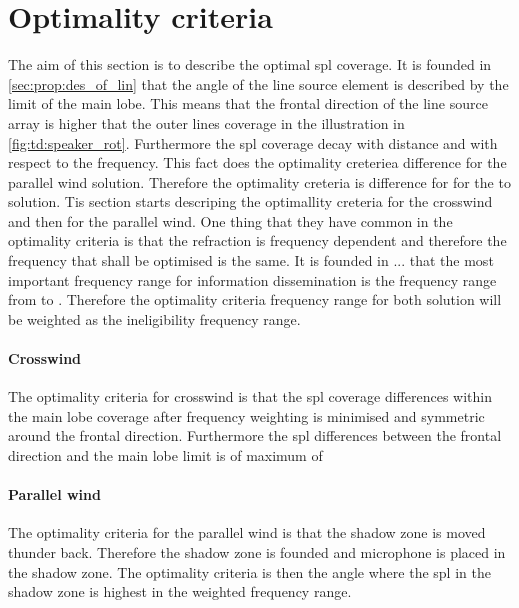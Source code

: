 \section{Optimality criteria}
The aim of this section is to describe the optimal \gls{spl} coverage. It is founded in \autoref{sec:prop:des_of_lin} that the angle of the line source element is described by the  limit of the main lobe. This means that the frontal direction of the line source array is  higher that the outer lines coverage in the illustration in \autoref{fig:td:speaker_rot}. Furthermore the \gls{spl} coverage decay with distance and with respect to the frequency. This fact does the optimality creteriea difference for the parallel wind solution. Therefore the optimality creteria is difference for for the to solution. Tis section starts descriping the optimallity creteria for the crosswind and then for the parallel wind. One thing that they have common in the optimality criteria is that the refraction is frequency dependent and therefore the frequency that shall be optimised is the same. It is founded in ... that the most important frequency range for information dissemination is the frequency range from  to . Therefore the optimality criteria frequency range for both solution will be weighted as the ineligibility frequency range. 


\paragraph{Crosswind} The optimality criteria for crosswind is that the \gls{spl} coverage differences within the main lobe coverage after frequency weighting is minimised and symmetric around the frontal direction. Furthermore the \gls{spl} differences between the frontal direction and the main lobe limit is of maximum of 

\paragraph{Parallel wind} The optimality criteria for the parallel wind is that the shadow zone is moved thunder back. Therefore the shadow zone is founded and microphone is placed in the shadow zone. The optimality criteria is then the angle where the \gls{spl} in the shadow zone is highest in the weighted frequency range. 
